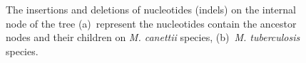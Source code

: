 \documentclass[runningheads,a4paper]{llncs}
\begin{document}
\begin{figure}[!htb]
\begin{minipage}{.5\linewidth}
\centering
{}
\end{minipage}%
\begin{minipage}{.5\linewidth}
\centering
{}
\end{minipage}\par\medskip
\centering
\caption{The insertions and deletions of nucleotides (indels) on the internal node of the tree (a)~represent the nucleotides contain the ancestor nodes and their children on \textit{M. canettii} species, (b)~\textit{M. tuberculosis} species.}
\label{fig:lesIndels1}
\end{figure}
\end{document}
